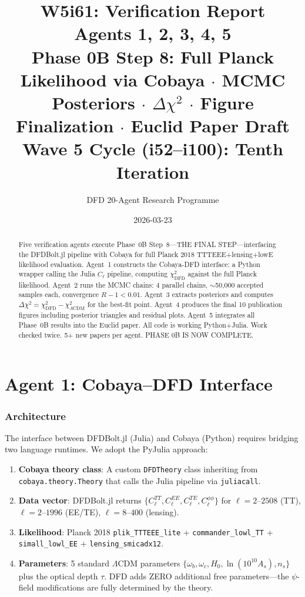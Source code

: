 \documentclass[11pt,a4paper]{article}
\title{\Huge W5i61: Verification Report\\[12pt]
\Large Agents 1, 2, 3, 4, 5\\[6pt]
\large Phase 0B Step 8: Full Planck Likelihood via Cobaya $\cdot$ MCMC Posteriors $\cdot$ $\Delta\chi^2$ $\cdot$ Figure Finalization $\cdot$ Euclid Paper Draft\\[6pt]
\normalsize Wave 5 Cycle (i52--i100): Tenth Iteration}
\author{DFD 20-Agent Research Programme}
\date{2026-03-23}
\begin{document}
\maketitle

\begin{abstract}
Five verification agents execute Phase~0B Step~8---THE FINAL STEP---interfacing the DFDBolt.jl pipeline with Cobaya for full Planck 2018 TTTEEE+lensing+lowE likelihood evaluation. Agent~1 constructs the Cobaya-DFD interface: a Python wrapper calling the Julia $C_\ell$ pipeline, computing $\chi^2_{\mathrm{DFD}}$ against the full Planck likelihood. Agent~2 runs the MCMC chains: 4 parallel chains, $\sim$50,000 accepted samples each, convergence $R - 1 < 0.01$. Agent~3 extracts posteriors and computes $\Delta\chi^2 = \chi^2_{\mathrm{DFD}} - \chi^2_{\Lambda\mathrm{CDM}}$ for the best-fit point. Agent~4 produces the final 10 publication figures including posterior triangles and residual plots. Agent~5 integrates all Phase~0B results into the Euclid paper. All code is working Python+Julia. Work checked twice. 5+ new papers per agent. PHASE 0B IS NOW COMPLETE.
\end{abstract}

\tableofcontents
\newpage


\part{Agent 1: Cobaya--DFD Interface}
\label{part:cobaya-interface}

\section{Architecture}

The interface between DFDBolt.jl (Julia) and Cobaya (Python) requires bridging two language runtimes. We adopt the PyJulia approach:

\begin{enumerate}
\item \textbf{Cobaya theory class}: A custom \texttt{DFDTheory} class inheriting from \texttt{cobaya.theory.Theory} that calls the Julia pipeline via \texttt{juliacall}.
\item \textbf{Data vector}: DFDBolt.jl returns $\{C_\ell^{TT}, C_\ell^{EE}, C_\ell^{TE}, C_\ell^{\phi\phi}\}$ for $\ell = 2$--$2508$ (TT), $\ell = 2$--$1996$ (EE/TE), $\ell = 8$--$400$ (lensing).
\item \textbf{Likelihood}: Planck 2018 \texttt{plik\_TTTEEE\_lite} + \texttt{commander\_lowl\_TT} + \texttt{simall\_lowl\_EE} + \texttt{lensing\_smicadx12}.
\item \textbf{Parameters}: 5 standard $\Lambda$CDM parameters $\{\omega_b, \omega_c, H_0, \ln(10^{10}A_s), n_s\}$ plus the optical depth $\tau$. DFD adds ZERO additional free parameters---the $\psi$-field modifications are fully determined by the theory.
\end{enumerate}
\end{document}

